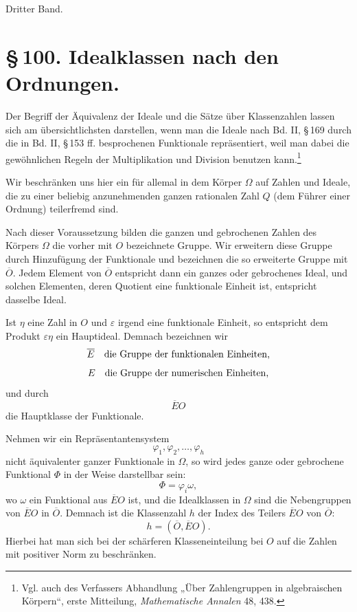 \documentclass[11pt]{article}
\begin{document}
\begin{center}{\large Dritter Band.}\end{center}

\section*{\S\,100. Idealklassen nach den Ordnungen.}

Der Begriff der Äquivalenz der Ideale und die Sätze über Klassenzahlen lassen sich am übersichtlichsten darstellen, wenn man die Ideale nach Bd. II, \S\,169 durch die in Bd. II, \S\,153 ff. besprochenen Funktionale repräsentiert, weil man dabei die gewöhnlichen Regeln der Multiplikation und Division benutzen kann.\footnote{Vgl. auch des Verfassers Abhandlung „Über Zahlengruppen in algebraischen Körpern“, erste Mitteilung, \emph{Mathematische Annalen} 48, 438.}

Wir beschränken uns hier ein für allemal in dem Körper \(\Omega\) auf Zahlen und Ideale, die zu einer beliebig anzunehmenden ganzen rationalen Zahl \(Q\) (dem Führer einer Ordnung) teilerfremd sind.

Nach dieser Voraussetzung bilden die ganzen und gebrochenen Zahlen des Körpers \(\Omega\) die vorher mit \(O\) bezeichnete Gruppe. Wir erweitern diese Gruppe durch Hinzufügung der Funktionale und bezeichnen die so erweiterte Gruppe mit \(\overline O\). Jedem Element von \(\overline O\) entspricht dann ein ganzes oder gebrochenes Ideal, und solchen Elementen, deren Quotient eine funktionale Einheit ist, entspricht dasselbe Ideal.

Ist \(\eta\) eine Zahl in \(O\) und \(\varepsilon\) irgend eine funktionale Einheit, so entspricht dem Produkt \(\varepsilon\eta\) ein Hauptideal. Demnach bezeichnen wir
\[
 \overline E\quad\hbox{die Gruppe der funktionalen Einheiten,}
\]
\[
 E\quad\hbox{die Gruppe der numerischen Einheiten,}
\]
und durch
\[
 \overline EO
\]
die Hauptklasse der Funktionale.

Nehmen wir ein Repräsentantensystem
\begin{equation}
 \varphi_1,\varphi_2,\ldots,\varphi_h
\tag{1}
\end{equation}
nicht äquivalenter ganzer Funktionale in \(\Omega\), so wird jedes ganze oder gebrochene Funktional \(\Phi\) in der Weise darstellbar sein:
\[
 \Phi=\varphi_i\omega,
\]
wo \(\omega\) ein Funktional aus \(\overline EO\) ist, und die Idealklassen in \(\Omega\) sind die Nebengruppen von \(\overline EO\) in \(\overline O\). Demnach ist die Klassenzahl \(h\) der Index des Teilers \(\overline EO\) von \(\overline O\):
\begin{equation}
 h=(\overline O,\overline EO).
\tag{2}
\end{equation}
Hierbei hat man sich bei der schärferen Klasseneinteilung bei \(O\) auf die Zahlen mit positiver Norm zu beschränken.
\end{document}
